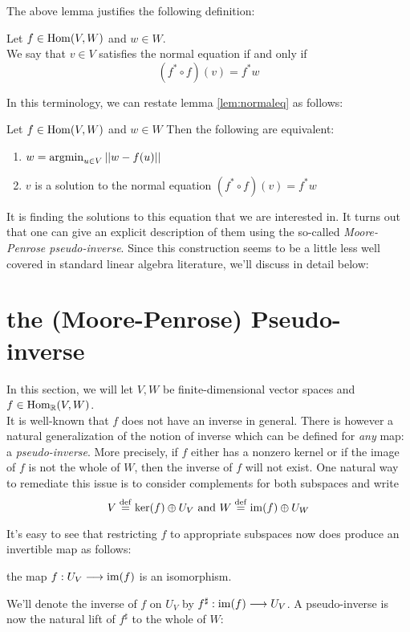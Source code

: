 The above lemma justifies the following definition:

\begin{definition}
	Let $f \in \operatorname{Hom}(V,W)$ and $w \in W$.\\ 
	We say that $v \in V$ satisfies the normal equation if and only if 
	\[
	(f^* \circ f)(v) = f^* w
	\]
\end{definition}
In this terminology, we can restate lemma \ref{lem:normaleq} as follows:
\begin{lemma}
	Let $f \in \operatorname{Hom}(V,W)$ and $w \in W$ Then the following are equivalent:
	\begin{enumerate}
		\item $w =\operatorname{argmin}_{u \in V}\vert \vert w-f(u)\vert \vert$
		\item $v$ is a solution to the normal equation $(f^* \circ f)(v) = f^* w$
	\end{enumerate}
\end{lemma}
\noindent It is finding the solutions to this equation that we are interested in. It turns out that one can give an explicit description of them using the so-called \emph{Moore-Penrose pseudo-inverse}. Since this construction seems to be a little less well covered in standard linear algebra literature, we'll discuss in detail below: 
\section{the (Moore-Penrose) Pseudo-inverse}

In this section, we will let $V, W$ be finite-dimensional vector spaces and $f \in \operatorname{Hom}_{\mathbb{R}}(V,W)$.\\ It is well-known that $f$ does not have an inverse in general. There is however a natural generalization of the notion of inverse which can be defined for \emph{any} map: a \emph{pseudo-inverse}. More precisely, if $f$ either has  a nonzero kernel or if the image of $f$ is not the whole of $W$, then the inverse of $f$ will not exist. One natural way to remediate this issue is to consider complements for both subspaces and write 
\[V\stackrel{\operatorname{def}}{=} \ker(f)\oplus U_V \textrm{ and } W\stackrel{\operatorname{def}}{=} \operatorname{im}(f)\oplus U_W\]

It's easy to see that restricting $f$ to appropriate subspaces now does produce an invertible map as follows:

\begin{lemma}
	the map $f: U_V\longrightarrow \operatorname{im}(f)$ is an isomorphism.
\end{lemma}
\noindent We'll denote the inverse of $f$ on $U_V$ by $f^\sharp:\operatorname{im}(f)\longrightarrow U_V$. A pseudo-inverse is now the natural lift of $f^\sharp$ to the whole of $W$:



